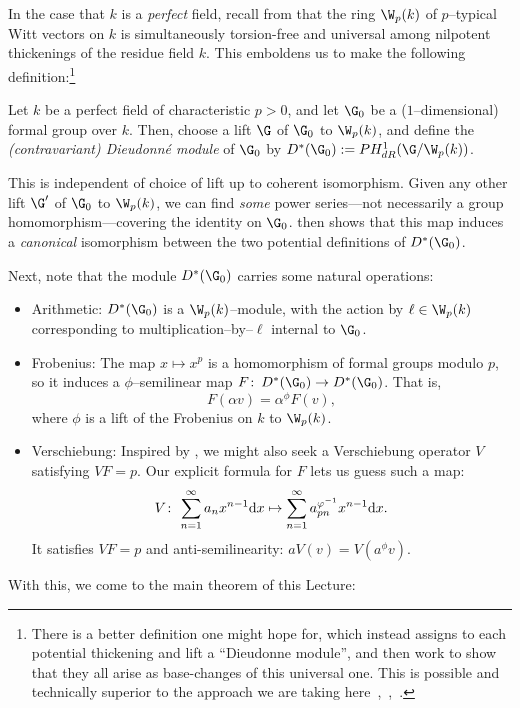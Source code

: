 In the case that \(k\) is a \emph{perfect} field, recall from  that the ring \(\W_p(k)\) of \(p\)--typical Witt vectors on \(k\) is simultaneously torsion-free and universal among nilpotent thickenings of the residue field \(k\).  This emboldens us to make the following definition:\footnote{There is a better definition one might hope for, which instead assigns to each potential thickening and lift a ``Dieudonne module'', and then work to show that they all arise as base-changes of this universal one.  This is possible and technically superior to the approach we are taking here~\cite[Theorem 5.1.6]{Katz},~\cite[Chapter 4]{Messing},~\cite{GrothendieckCristaux}.}

\begin{definition}{\cite[Section 5.5]{Katz}}
Let \(k\) be a perfect field of characteristic \(p > 0\), and let \(\G_0\) be a (\(1\)--dimensional) formal group over \(k\).  Then, choose a lift \(\G\) of \(\G_0\) to \(\W_p(k)\), and define the \textit{(contravariant) Dieudonn\'e module} of \(\G_0\) by \(D^*(\G_0) := PH^1_{dR}(\G / \W_p(k))\).
\end{definition}

\begin{remark}
This is independent of choice of lift up to coherent isomorphism.  Given any other lift \(\G'\) of \(\G_0\) to \(\W_p(k)\), we can find \emph{some} power series---not necessarily a group homomorphism---covering the identity on \(\G_0\).   then shows that this map induces a \emph{canonical} isomorphism between the two potential definitions of \(D^*(\G_0)\).
\end{remark}

Next, note that the module \(D^*(\G_0)\) carries some natural operations:
\begin{itemize}
\item Arithmetic: \(D^*(\G_0)\) is a \(\W_p(k)\)--module, with the action by \(\ell \in \W_p(k)\) corresponding to multiplication--by--\(\ell\) internal to \(\G_0\).
\item {}Frobenius: The map \(x \mapsto x^p\) is a homomorphism of formal groups modulo \(p\), so it induces a \(\phi\)--semilinear map \(F\co D^*(\G_0) \to D^*(\G_0)\).  That is, \[F(\alpha v) = \alpha^\phi F(v),\] where \(\phi\) is a lift of the Frobenius on \(k\) to \(\W_p(k)\).
\item {}Verschiebung: Inspired by , we might also seek a Verschiebung operator \(V\) satisfying \(VF = p\).  Our explicit formula for \(F\) lets us guess such a map: \[V\colon\thinspace \sum_{n=1}^\infty a_n x^{n-1} \mathrm{d}x \mapsto \sum_{n=1}^\infty a_{pn}^{\varphi^{-1}} x^{n-1} \mathrm{d}x.\]  It satisfies \(VF = p\) and anti-semilinearity: \(aV(v) = V(a^\phi v)\).
\end{itemize}
With this, we come to the main theorem of this Lecture:

